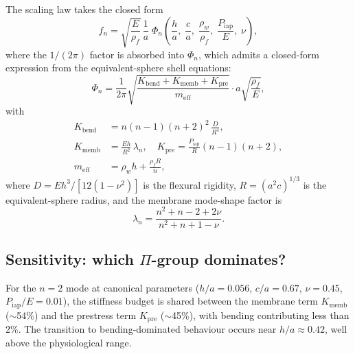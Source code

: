 \documentclass[review]{elsarticle}
\begin{document}
The scaling law takes the closed form
\begin{equation}
  f_n = \sqrt{\frac{E}{\rho_f}}\,\frac{1}{a}\;
        \Phi_n\!\left(\frac{h}{a},\;\frac{c}{a},\;
        \frac{\rho_w}{\rho_f},\;\frac{P_\mathrm{iap}}{E},\;\nu\right),
  \label{eq:scaling_law}
\end{equation}
where the $1/(2\pi)$ factor is absorbed into $\Phi_n$, which admits a
closed-form expression from the equivalent-sphere shell equations:
\begin{equation}
  \Phi_n = \frac{1}{2\pi}\sqrt{
    \frac{K_{\mathrm{bend}} + K_{\mathrm{memb}} + K_{\mathrm{pre}}}
         {m_{\mathrm{eff}}}
  } \cdot a\sqrt{\frac{\rho_f}{E}},
\end{equation}
with
\begin{align}
  K_{\mathrm{bend}} &= n(n-1)(n+2)^2\,\frac{D}{R^4}, \\
  K_{\mathrm{memb}} &= \frac{Eh}{R^2}\,\lambda_n, \quad
  K_{\mathrm{pre}} = \frac{P_\mathrm{iap}}{R}(n-1)(n+2), \\
  m_{\mathrm{eff}} &= \rho_w h + \frac{\rho_f R}{n},
\end{align}
where $D = Eh^3/[12(1-\nu^2)]$ is the flexural rigidity,
$R = (a^2 c)^{1/3}$ is the equivalent-sphere radius, and
the membrane mode-shape factor is
\begin{equation}
  \lambda_n = \frac{n^2 + n - 2 + 2\nu}{n^2 + n + 1 - \nu}.
  \label{eq:lambda_n}
\end{equation}

\subsection{Sensitivity: which $\Pi$-group dominates?}

For the $n=2$ mode at canonical parameters ($h/a = 0.056$, $c/a = 0.67$,
$\nu = 0.45$, $P_\mathrm{iap}/E = 0.01$), the stiffness budget is shared
between the membrane term $K_\mathrm{memb}$ ($\sim$54\%) and the prestress
term $K_\mathrm{pre}$ ($\sim$45\%), with bending contributing less than 2\%.
The transition to bending-dominated behaviour occurs near $h/a \approx
0.42$, well above the physiological range.
\end{document}
